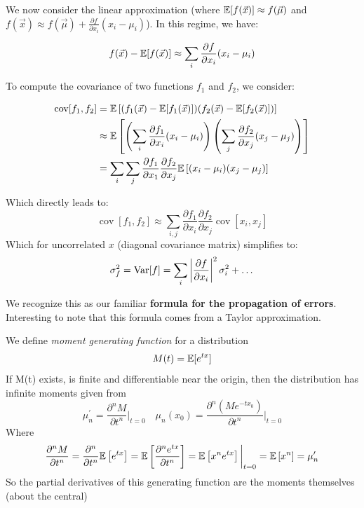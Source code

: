 We now consider the linear approximation (where $\mathbb{E}[f(\vec{x})]\approx f(\vec{\mu})$ and $f(\vec{x}) \approx f(\vec{\mu}) + \frac{\partial f}{\partial x_i}(x_i-\mu_i)$). In this regime, we have:

	\[
	f(\vec{x}) - \mathbb{E}[f(\vec{x})] \approx \sum_i \frac{\partial f}{\partial x_i}(x_i-\mu_i)
	\]
	
To compute the covariance of two functions $f_1$ and $f_2$, we consider:

	\begin{align*}
		\operatorname{cov}[f_1,f_2]&=\mathbb{E} \left[(f_1(\vec{x})-\mathbb{E}[f_1(\vec{x})])(f_2(\vec{x})-\mathbb{E}[f_2(\vec{x})])\right] \\
		&\approx \mathbb{E} \left[\left(\sum_i\frac{\partial f_1}{\partial x_i}(x_i-\mu_i)\right)\left(\sum_j\frac{\partial f_2}{\partial x_j}(x_j-\mu_j)\right)\right] \\
		&= \sum_i \sum_j \frac{\partial f_1}{\partial x_1} \frac{\partial f_2}{\partial x_j} \mathbb{E} \left[(x_i-\mu_i)(x_j-\mu_j)\right]
	\end{align*}

Which directly leads to:
	\[
	\operatorname{cov}[f_1,f_2] \approx \sum_{i,j}\frac{\partial f_1}{\partial x_i}\frac{\partial f_2}{\partial x_j}\operatorname{cov}[x_i,x_j]
	\]
Which for uncorrelated $x$ (diagonal covariance matrix) simplifies to:
	\[
	\sigma_f^2 = \operatorname{Var}[f] = \sum_i \left| \frac{\partial f}{\partial x_i} \right|^2\sigma_i^2 +\dots
	\]
	
We recognize this as our familiar \textbf{formula for the propagation of errors}. Interesting to note that this formula comes from a Taylor approximation.
	
\begin{definition}
	We define \emph{moment generating function} for a distribution 
	\[
	M(t) = \mathbb{E}[e^{tx}]
	\]
	If M(t) exists, is finite and differentiable near the origin, then the distribution has infinite moments given from
	\[
	\mu^\prime_n = \frac{\partial^n M}{\partial t^n}\bigg\rvert_{t=0} \quad \mu_n(x_0) = \frac{\partial^n \left( Me^{-tx_0} \right)}{\partial t^n}\bigg\rvert_{t=0}
	\]
	Where
	\[
	\frac{\partial^n M}{\partial t^n} = \frac{\partial^n}{\partial t^n} \mathbb{E}\left[e^{tx}\right] =  \mathbb{E}\left[\frac{\partial^ne^{tx}}{\partial t^n}\right] = \mathbb{E}\left[x^ne^{tx}\right]\bigg\rvert_{t=0} = \mathbb{E}\left[ x^n \right] = \mu_n^\prime
	\]
	So the partial derivatives of this generating function are the moments themselves (about the central)
\end{definition}
	

